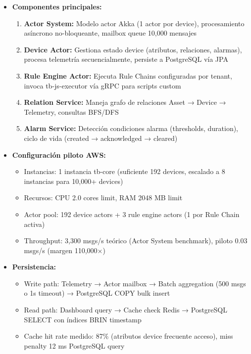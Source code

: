\begin{itemize}
    \item \textbf{Componentes principales:}
    \begin{enumerate}
        \item \textbf{Actor System:} Modelo actor Akka (1 actor por device), procesamiento asíncrono no-bloqueante, mailbox queue 10,000 mensajes
        \item \textbf{Device Actor:} Gestiona estado device (atributos, relaciones, alarmas), procesa telemetría secuencialmente, persiste a PostgreSQL vía JPA
        \item \textbf{Rule Engine Actor:} Ejecuta Rule Chains configuradas por tenant, invoca tb-js-executor vía gRPC para scripts custom
        \item \textbf{Relation Service:} Maneja grafo de relaciones Asset → Device → Telemetry, consultas BFS/DFS
        \item \textbf{Alarm Service:} Detección condiciones alarma (thresholds, duration), ciclo de vida (created → acknowledged → cleared)
    \end{enumerate}
    
    \item \textbf{Configuración piloto AWS:}
    \begin{itemize}
        \item Instancias: 1 instancia tb-core (suficiente 192 devices, escalado a 8 instancias para 10,000+ devices)
        \item Recursos: CPU 2.0 cores limit, RAM 2048 MB limit
        \item Actor pool: 192 device actors + 3 rule engine actors (1 por Rule Chain activa)
        \item Throughput: 3,300 msgs/s teórico (Actor System benchmark), piloto 0.03 msgs/s (margen 110,000×)
    \end{itemize}
    
    \item \textbf{Persistencia:}
    \begin{itemize}
        \item Write path: Telemetry → Actor mailbox → Batch aggregation (500 msgs o 1s timeout) → PostgreSQL COPY bulk insert
        \item Read path: Dashboard query → Cache check Redis → PostgreSQL SELECT con índices BRIN timestamp
        \item Cache hit rate medido: 87\% (atributos device frecuente acceso), miss penalty 12 ms PostgreSQL query
    \end{itemize}
\end{itemize}

